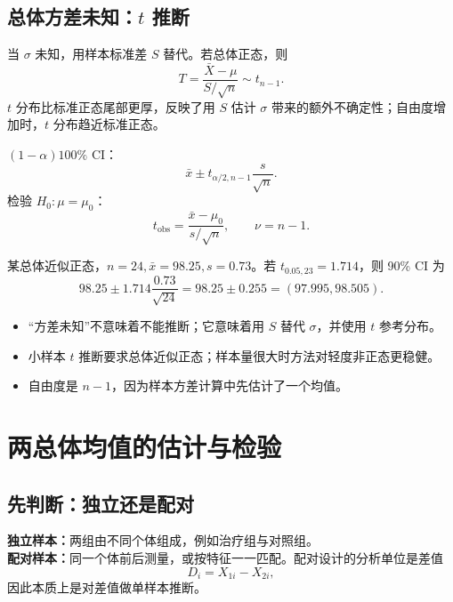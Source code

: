 \documentclass[11pt,a4paper]{article}
\newcommand{\1}{\mathbf{1}}
\begin{document}
\subsection{\texorpdfstring{总体方差未知：$t$ 推断}{总体方差未知：t 推断}}

当 $\sigma$ 未知，用样本标准差 $S$ 替代。若总体正态，则
\[
  \boxed{
  T=\frac{\bar X-\mu}{S/\sqrt n}\sim t_{n-1}.
  }
\]
$t$ 分布比标准正态尾部更厚，反映了用 $S$ 估计 $\sigma$ 带来的额外不确定性；自由度增加时，$t$ 分布趋近标准正态。

\begin{memorybox}
$(1-\alpha)100\%$ CI：
\[
  \boxed{\bar x\pm t_{\alpha/2,n-1}\frac{s}{\sqrt n}.}
\]
检验 $H_0:\mu=\mu_0$：
\[
  \boxed{
  t_{\mathrm{obs}}
  =
  \frac{\bar x-\mu_0}{s/\sqrt n},
  \qquad \nu=n-1.
  }
\]
\end{memorybox}

\begin{examplebox}[单均值 $t$ 区间]
某总体近似正态，$n=24,\bar x=98.25,s=0.73$。若
$t_{0.05,23}=1.714$，则 90\% CI 为
\[
  98.25\pm1.714\frac{0.73}{\sqrt{24}}
  =
  98.25\pm0.255
  =
  (97.995,98.505).
\]
\end{examplebox}

\begin{warnbox}
\begin{itemize}
  \item “方差未知”不意味着不能推断；它意味着用 $S$ 替代 $\sigma$，并使用 $t$ 参考分布。
  \item 小样本 $t$ 推断要求总体近似正态；样本量很大时方法对轻度非正态更稳健。
  \item 自由度是 $n-1$，因为样本方差计算中先估计了一个均值。
\end{itemize}
\end{warnbox}

\section{两总体均值的估计与检验}

\subsection{先判断：独立还是配对}

\begin{conceptbox}
\textbf{独立样本：}两组由不同个体组成，例如治疗组与对照组。\\
\textbf{配对样本：}同一个体前后测量，或按特征一一匹配。配对设计的分析单位是差值
\[
  D_i=X_{1i}-X_{2i},
\]
因此本质上是对差值做单样本推断。
\end{conceptbox}
\end{document}

